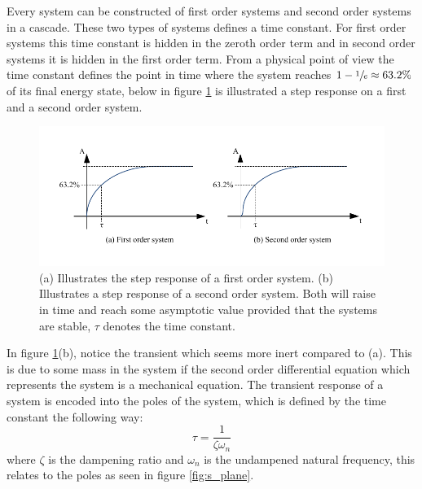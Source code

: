 Every system can be constructed of first order systems and second order systems in a cascade. These two types of systems defines a time constant. For first order systems this time constant is hidden in the zeroth order term and in second order systems it is hidden in the first order term. From a physical point of view the time constant defines the point in time where the system reaches $1 - \sfrac{1}{e} \approx 63.2\%$ of its final energy state, below in figure \ref{fig:energy_systems} is illustrated a step response on a first and a second order system.
\begin{figure}[htb]
	\begin{center}
	\includegraphics[scale=1,trim=0 0 0 0]{graphics/energy_systems.pdf} %
	\caption{(a) Illustrates the step response of a first order system. (b) Illustrates a step response of a second order system. Both will raise in time and reach some asymptotic value provided that the systems are stable, $\tau$ denotes the time constant.}
	\label{fig:energy_systems}			%
	\end{center}
\end{figure}
In figure \ref{fig:energy_systems}(b), notice the transient which seems more inert compared to (a). This is due to some mass in the system if the second order differential equation which represents the system is a mechanical equation. The transient response of a system is encoded into the poles of the system, which is defined by the time constant the following way:
\begin{equation}
	\tau = \frac{1}{\zeta\omega_{n}}\label{eq:time_constant}
\end{equation}
where $\zeta$ is the dampening ratio and $\omega_{n}$ is the undampened natural frequency, this relates to the poles as seen in figure \ref{fig:s_plane}.
